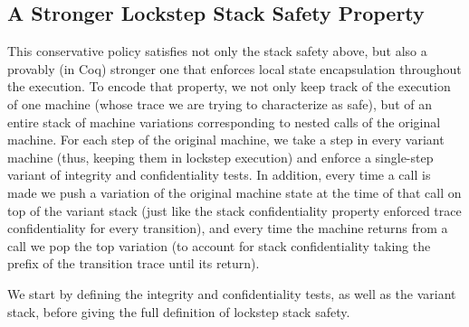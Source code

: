\documentclass[acmsmall,review,anonymous]{acmart}\settopmatter{printfolios=true,printccs=false,printacmref=false}
\begin{document}


\subsection{A Stronger Lockstep Stack Safety Property}
\label{sec:lockstep}


This conservative policy satisfies not only the stack safety above,
but also a provably (in Coq) stronger one that enforces local state
encapsulation throughout the execution. To encode that
property, we not only keep track of the execution of one machine
(whose trace we are trying to characterize as safe), but of an entire
stack of machine variations corresponding to nested calls of the
original machine. For each step of the original machine, we take a
step in every variant machine (thus, keeping them in lockstep
execution) and enforce a single-step variant of integrity and
confidentiality tests. In addition, every time a call is made we push
a variation of the original machine state at the time of that call on
top of the variant stack (just like the stack confidentiality property
enforced trace confidentiality for every transition), and every time
the machine returns from a call we pop the top variation (to account
for stack confidentiality taking the prefix of the transition trace
until its return).

We start by defining the integrity and confidentiality tests, as well
as the variant stack, before giving the full definition of lockstep
stack safety.

\newcommand{\vse}{\mathit{vse}}
\newcommand{\VSES}{\mathit{VSE}}
\newcommand{\vs}{\mathit{vs}}
\newcommand{\VSS}{\mathit{VS}}

\newcommand*{\vm}[1]{\ensuremath{\mathit{vm}_{#1}}}
\newcommand*{\testInt}[3]{\ensuremath{\mathit{int}_T ~ #1 ~ #2 ~ #3}}
\newcommand*{\testConf}[2]{\ensuremath{\mathit{conf}_T ~ #1 ~ #2}}
\newcommand*{\testVS}[2]{\ensuremath{\mathit{\vs}_T ~ #1 ~ #2}}
\newcommand*{\testProp}[3]{\ensuremath{\mathit{stack}_T ~ #1 ~ #2 ~ #3}}
\end{document}
